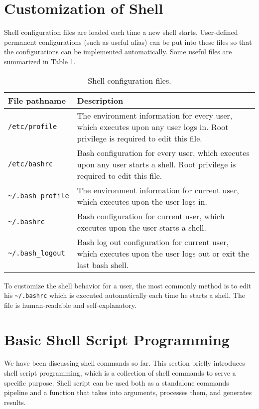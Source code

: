 \section{Customization of Shell} \label{ch:sb:subsec:customizeshell}

Shell configuration files are loaded each time a new shell starts. User-defined permanent configurations (such as useful alias) can be put into these files so that the configurations can be implemented automatically. Some useful files are summarized in Table \ref{ch:sb:tab:shellconfig}.

\begin{table}
	\centering \caption{Shell configuration files.}\label{ch:sb:tab:shellconfig}
	\begin{tabularx}{\textwidth}{lX}
		\hline
		File pathname & Description \\ \hline
		\verb|/etc/profile| & The environment information for every user, which executes upon any user logs in. Root privilege is required to edit this file.  \\ 
		\verb|/etc/bashrc| & Bash configuration for every user, which executes upon any user starts a shell. Root privilege is required to edit this file. \\ 
		\verb|~/.bash_profile| & The environment information for current user, which executes upon the user logs in. \\ 
		\verb|~/.bashrc| & Bash configuration for current user, which executes upon the user starts a shell. \\ 
		\verb|~/.bash_logout| & Bash log out configuration for current user, which executes upon the user logs out or exit the last bash shell. \\ \hline
	\end{tabularx}
\end{table}

To customize the shell behavior for a user, the most commonly method is to edit his \verb|~/.bashrc| which is executed automatically each time he starts a shell. The file is human-readable and self-explanatory.

\section{Basic Shell Script Programming}

We have been discussing shell commands so far. This section briefly introduces shell script programming, which is a collection of shell commands to serve a specific purpose. Shell script can be used both as a standalone commands pipeline and a function that takes into arguments, processes them, and generates results.

